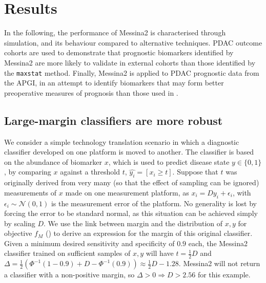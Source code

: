 \documentclass[dissertation.tex]{subfiles}
\begin{document}
\section{Results}
In the following, the performance of Messina2 is characterised through simulation, and its behaviour compared to alternative techniques.  \gls{PDAC} outcome cohorts are used to demonstrate that prognostic biomarkers identified by Messina2 are more likely to validate in external cohorts than those identified by the \texttt{maxstat} method.  Finally, Messina2 is applied to \gls{PDAC} prognostic data from the \gls{APGI}, in an attempt to identify biomarkers that may form better preoperative measures of prognosis than those used in .

\subsection{Large-margin classifiers are more robust}
We consider a simple technology translation scenario in which a diagnostic classifier developed on one platform is moved to another.  The classifier is based on the abundance of biomarker $x$, which is used to predict disease state $y \in \{0, 1\}$, by comparing $x$ against a threshold $t$, $\hat{y_i} = [x_i \geq t]$.  Suppose that $t$ was originally derived from very many (so that the effect of sampling can be ignored) measurements of $x$ made on one measurement platform, as $x_i = D y_i + \epsilon_i$, with $\epsilon_i \sim \mathcal{N}(0, 1)$ is the measurement error of the platform.  No generality is lost by forcing the error to be standard normal, as this situation can be achieved simply by scaling $D$.  We use the link between margin and the distribution of $x, y$ for objective $f_M$ () to derive an expression for the margin of this original classifier.  Given a minimum desired sensitivity and specificity of $0.9$ each, the Messina2 classifier trained on sufficient samples of $x, y$ will have $t = \frac{1}{2}D$ and $\Delta = \frac{1}{2}(\Phi^{-1}(1-0.9)+D-\Phi^{-1}(0.9)) \approx \frac{1}{2}D - 1.28$.  Messina2 will not return a classifier with a non-positive margin, so $\Delta > 0 \Rightarrow D > 2.56$ for this example.
\end{document}
